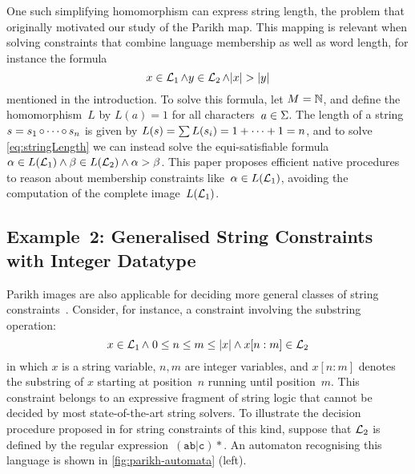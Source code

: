 \documentclass[acmsmall,review,anonymous,screen]{acmart}\settopmatter{printfolios=true,printccs=true,printacmref=true}
\theoremstyle{definition}
\begin{document}
One such simplifying homomorphism can express string
length, the problem that originally motivated our study of the Parikh
map. This mapping is relevant when solving constraints that combine
language membership as well as word length, for instance the formula
\begin{equation}\label{eq:stringLength}
x \in \operatorname{\mathcal{L}}_1 \wedge y \in \operatorname{\mathcal{L}}_2 \wedge |x| > |y|
\end{equation}
mentioned in the introduction. To solve this formula, let
$M = \mathbb{N}$, and define the homomorphism~$L$ by $L(a) = 1$
for all characters~$a \in \Sigma$. The length of a string
$s = s_1 \operatorname{\circ} \cdots \operatorname{\circ} s_n$ is given by
$L(s) = \sum L(s_i) = 1 + \cdots + 1 = n$, and to solve
\eqref{eq:stringLength} we can instead solve the equi-satisfiable
formula~$\alpha \in L(\operatorname{\mathcal{L}}_1) \wedge \beta \in L(\operatorname{\mathcal{L}}_2)
\wedge \alpha > \beta$. This paper proposes efficient native
procedures to reason about membership constraints
like~$\alpha \in L(\operatorname{\mathcal{L}}_1)$, avoiding the computation of
the complete image~$L(\operatorname{\mathcal{L}}_1)$.

\subsection{Example~2: Generalised String Constraints with Integer
  Datatype}\label{sec:parikh-automata}

Parikh images are also applicable for deciding more general classes of
string constraints~\cite{ostrich-plus}. Consider, for instance, a
constraint involving the substring operation:
\begin{equation}
  \label{eq:substring}
  x \in \operatorname{\mathcal{L}}_1 \wedge \; 0 \leq n \leq m \leq |x| \wedge x[n:m] \in \operatorname{\mathcal{L}}_2
\end{equation}
in which $x$ is a string variable, $n, m$ are integer variables, and
$x[n:m]$ denotes the substring of $x$ starting at position~$n$ running
until position~$m$. This constraint belongs to an expressive fragment
of string logic that cannot be decided by most state-of-the-art string
solvers. To illustrate the decision procedure proposed in
\cite{ostrich-plus} for string constraints of this kind, suppose that
$\operatorname{\mathcal{L}}_2$ is defined by the regular
expression~$\mathtt{(ab|c)*}$. An automaton recognising this language
is shown in \cref{fig:parikh-automata} (left).
\end{document}
